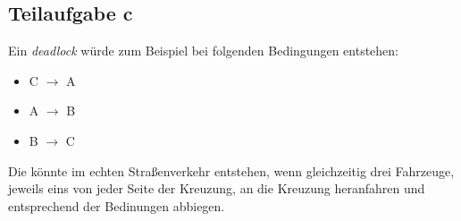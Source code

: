 \documentclass[koma,a4paper,10pt]{org-article}
\begin{document}
\subsection{Teilaufgabe c}
\label{sec-4-3}
Ein \textit{deadlock} würde zum Beispiel bei folgenden Bedingungen entstehen:
\begin{itemize}
\item C $\to$ A
\item A $\to$ B
\item B $\to$ C
\end{itemize}
Die könnte im echten Straßenverkehr entstehen, wenn gleichzeitig drei Fahrzeuge, jeweils eins von jeder Seite der Kreuzung, an die Kreuzung heranfahren und entsprechend der Bedinungen abbiegen.
\end{document}
